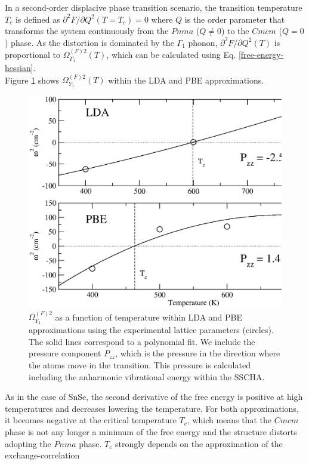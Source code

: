 In a second-order displacive phase transition scenario, the transition temperature $T_{c}$ is defined as 
$\partial^{2}F/\partial Q^{2}(T=T_{c})=0$ where $Q$ is the order parameter that transforms the system continuously 
from the $Pnma$ ($Q\ne0$) to the $Cmcm$ ($Q=0$) phase. As the distortion is dominated by the $\Gamma_{1}$ phonon, 
$\partial^{2}F/\partial Q^{2}(T)$ is proportional to $\Omega^{(F)2}_{\Gamma_{1}}(T)$, which can be calculated using 
Eq. \ref{free-energy-hessian}. \\

Figure \ref{freq-transition-mono} shows $\Omega^{(F)2}_{Y_{1}}(T)$ within the LDA and PBE approximations.
\begin{figure}[h]
\includegraphics[width=\linewidth]{Figures/freq-sns.eps}
        \caption[Phonon collapse in SnS.]{$\Omega^{(F)2}_{Y_{1}}$ as a function of temperature within LDA and PBE approximations using the experimental lattice parameters (circles). The solid lines correspond to a polynomial fit. We include the pressure component
$P_{zz}$, which is the pressure in the direction where the atoms move in the transition.  This pressure is calculated including the anharmonic vibrational energy within the SSCHA.}
\label{freq-transition-mono}
\end{figure}
As in the case of SnSe\cite{aseginolaza2019phonon}, the second derivative of the free energy is positive at high temperatures and decreases lowering the temperature. For both approximations, it becomes negative at the critical
temperature $T_c$, which means that the $Cmcm$ phase is not any longer a minimum of the free energy and the structure distorts adopting the $Pnma$ phase. $T_{c}$ strongly depends on the approximation of the exchange-correlation
